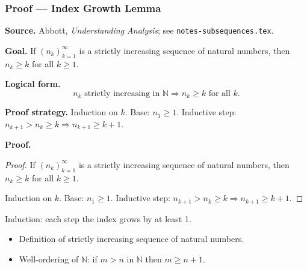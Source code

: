 
\clearpage
{}
\hypertarget{proof-RA-ABB-L-index-growth}{}

\subsubsection[Index Growth Lemma]{Proof --- Index Growth Lemma}

\bigskip

\noindent
\textbf{Source.} Abbott, \emph{Understanding Analysis}; see \texttt{notes-subsequences.tex}.

\vspace{0.75em}

\noindent
\textbf{Goal.} If $(n_k)_{k=1}^\infty$ is a strictly increasing sequence of natural numbers, then $n_k \ge k$ for all $k \ge 1$.

\vspace{0.75em}

\noindent
\textbf{Logical form.}
\[
  n_k \text{ strictly increasing in } \mathbb{N} \Rightarrow n_k \ge k \text{ for all } k.
\]

\vspace{0.75em}

\noindent
\textbf{Proof strategy.} Induction on $k$. Base: $n_1 \ge 1$. Inductive step: $n_{k+1} > n_k \ge k \Rightarrow n_{k+1} \ge k+1$.

\vspace{0.75em}

\noindent
\textbf{Proof.}
\begin{proof}
\Claim If $(n_k)_{k=1}^\infty$ is a strictly increasing sequence of natural numbers, then $n_k \ge k$ for all $k \ge 1$.

\Given 

\Goal 

\Strategy Induction on $k$. Base: $n_1 \ge 1$. Inductive step: $n_{k+1} > n_k \ge k \Rightarrow n_{k+1} \ge k+1$.

\medskip


\end{proof}

\begin{remark*}
Induction: each step the index grows by at least 1.
\end{remark*}

\begin{remark*}[Dependencies]
\begin{itemize}
  \item Definition of strictly increasing sequence of natural numbers.
  \item Well-ordering of $\mathbb{N}$: if $m > n$ in $\mathbb{N}$ then $m \ge n+1$.
\end{itemize}
\end{remark*}
